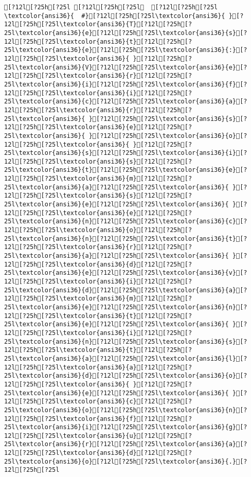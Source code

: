 \documentclass{scrartcl}
\begin{document}
\begin{Verbatim}
[?12l[?25h[?25l [?12l[?25h[?25l  [?12l[?25h[?25l
\textcolor{ansi36}{  #}[?12l[?25h[?25l\textcolor{ansi36}{ }[?12l[?25h[?25l\textcolor{ansi36}{T}[?12l[?25h[?25l\textcolor{ansi36}{e}[?12l[?25h[?25l\textcolor{ansi36}{s}[?12l[?25h[?25l\textcolor{ansi36}{t}[?12l[?25h[?25l\textcolor{ansi36}{e}[?12l[?25h[?25l\textcolor{ansi36}{:}[?12l[?25h[?25l\textcolor{ansi36}{ }[?12l[?25h[?25l\textcolor{ansi36}{V}[?12l[?25h[?25l\textcolor{ansi36}{e}[?12l[?25h[?25l\textcolor{ansi36}{r}[?12l[?25h[?25l\textcolor{ansi36}{i}[?12l[?25h[?25l\textcolor{ansi36}{f}[?12l[?25h[?25l\textcolor{ansi36}{i}[?12l[?25h[?25l\textcolor{ansi36}{c}[?12l[?25h[?25l\textcolor{ansi36}{a}[?12l[?25h[?25l\textcolor{ansi36}{r}[?12l[?25h[?25l\textcolor{ansi36}{ }[?12l[?25h[?25l\textcolor{ansi36}{s}[?12l[?25h[?25l\textcolor{ansi36}{e}[?12l[?25h[?25l\textcolor{ansi36}{ }[?12l[?25h[?25l\textcolor{ansi36}{o}[?12l[?25h[?25l\textcolor{ansi36}{ }[?12l[?25h[?25l\textcolor{ansi36}{s}[?12l[?25h[?25l\textcolor{ansi36}{i}[?12l[?25h[?25l\textcolor{ansi36}{s}[?12l[?25h[?25l\textcolor{ansi36}{t}[?12l[?25h[?25l\textcolor{ansi36}{e}[?12l[?25h[?25l\textcolor{ansi36}{m}[?12l[?25h[?25l\textcolor{ansi36}{a}[?12l[?25h[?25l\textcolor{ansi36}{ }[?12l[?25h[?25l\textcolor{ansi36}{s}[?12l[?25h[?25l\textcolor{ansi36}{e}[?12l[?25h[?25l\textcolor{ansi36}{ }[?12l[?25h[?25l\textcolor{ansi36}{e}[?12l[?25h[?25l\textcolor{ansi36}{n}[?12l[?25h[?25l\textcolor{ansi36}{c}[?12l[?25h[?25l\textcolor{ansi36}{o}[?12l[?25h[?25l\textcolor{ansi36}{n}[?12l[?25h[?25l\textcolor{ansi36}{t}[?12l[?25h[?25l\textcolor{ansi36}{r}[?12l[?25h[?25l\textcolor{ansi36}{a}[?12l[?25h[?25l\textcolor{ansi36}{ }[?12l[?25h[?25l\textcolor{ansi36}{d}[?12l[?25h[?25l\textcolor{ansi36}{e}[?12l[?25h[?25l\textcolor{ansi36}{v}[?12l[?25h[?25l\textcolor{ansi36}{i}[?12l[?25h[?25l\textcolor{ansi36}{d}[?12l[?25h[?25l\textcolor{ansi36}{a}[?12l[?25h[?25l\textcolor{ansi36}{m}[?12l[?25h[?25l\textcolor{ansi36}{e}[?12l[?25h[?25l\textcolor{ansi36}{n}[?12l[?25h[?25l\textcolor{ansi36}{t}[?12l[?25h[?25l\textcolor{ansi36}{e}[?12l[?25h[?25l\textcolor{ansi36}{ }[?12l[?25h[?25l\textcolor{ansi36}{i}[?12l[?25h[?25l\textcolor{ansi36}{n}[?12l[?25h[?25l\textcolor{ansi36}{s}[?12l[?25h[?25l\textcolor{ansi36}{t}[?12l[?25h[?25l\textcolor{ansi36}{a}[?12l[?25h[?25l\textcolor{ansi36}{l}[?12l[?25h[?25l\textcolor{ansi36}{a}[?12l[?25h[?25l\textcolor{ansi36}{d}[?12l[?25h[?25l\textcolor{ansi36}{o}[?12l[?25h[?25l\textcolor{ansi36}{ }[?12l[?25h[?25l\textcolor{ansi36}{e}[?12l[?25h[?25l\textcolor{ansi36}{ }[?12l[?25h[?25l\textcolor{ansi36}{c}[?12l[?25h[?25l\textcolor{ansi36}{o}[?12l[?25h[?25l\textcolor{ansi36}{n}[?12l[?25h[?25l\textcolor{ansi36}{f}[?12l[?25h[?25l\textcolor{ansi36}{i}[?12l[?25h[?25l\textcolor{ansi36}{g}[?12l[?25h[?25l\textcolor{ansi36}{u}[?12l[?25h[?25l\textcolor{ansi36}{r}[?12l[?25h[?25l\textcolor{ansi36}{a}[?12l[?25h[?25l\textcolor{ansi36}{d}[?12l[?25h[?25l\textcolor{ansi36}{o}[?12l[?25h[?25l\textcolor{ansi36}{.}[?12l[?25h[?25l

\end{Verbatim}
\end{document}
